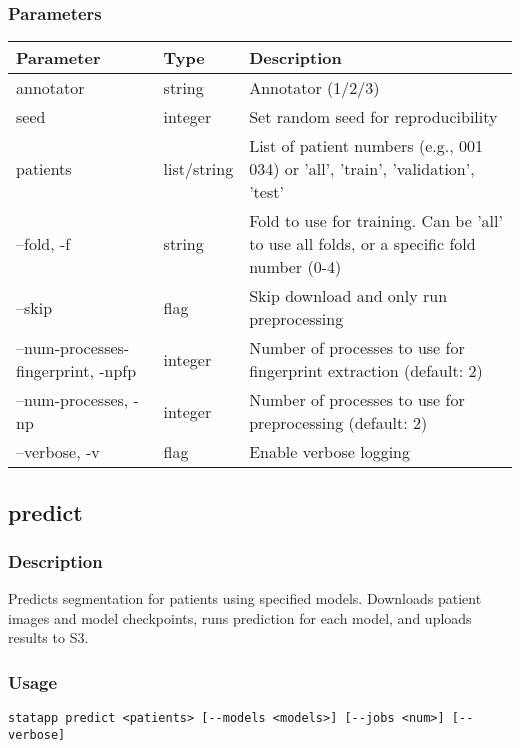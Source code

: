 \documentclass{article}
\begin{document}
\subsubsection{Parameters}
\begin{tabulary}{\linewidth}{LLL}
\toprule
\textbf{Parameter} & \textbf{Type} & \textbf{Description} \\
\midrule
annotator & string & Annotator (1/2/3) \\
seed & integer & Set random seed for reproducibility \\
patients & list/string & List of patient numbers (e.g., 001 034) or 'all', 'train', 'validation', 'test' \\
--fold, -f & string & Fold to use for training. Can be 'all' to use all folds, or a specific fold number (0-4) \\
--skip & flag & Skip download and only run preprocessing \\
--num-processes-fingerprint, -npfp & integer & Number of processes to use for fingerprint extraction (default: 2) \\
--num-processes, -np & integer & Number of processes to use for preprocessing (default: 2) \\
--verbose, -v & flag & Enable verbose logging \\
\bottomrule
\end{tabulary}

\subsection{predict}
\subsubsection{Description}
Predicts segmentation for patients using specified models. Downloads patient images and model checkpoints, runs prediction for each model, and uploads results to S3.

\subsubsection{Usage}
\begin{lstlisting}
statapp predict <patients> [--models <models>] [--jobs <num>] [--verbose]
\end{lstlisting}
\end{document}
